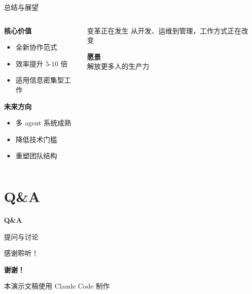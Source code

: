 \documentclass[aspectratio=169,xcolor=dvipsnames]{beamer}
\begin{document}
\begin{frame}{总结与展望}
  \begin{columns}
    \begin{column}{0.48\textwidth}
      \textbf{核心价值}
      \begin{itemize}
        \item 全新协作范式
        \item 效率提升 5-10 倍
        \item 适用信息密集型工作
      \end{itemize}

      \vspace{0.5cm}

      \textbf{未来方向}
      \begin{itemize}
        \item 多 agent 系统成熟
        \item 降低技术门槛
        \item 重塑团队结构
      \end{itemize}
    \end{column}
    \begin{column}{0.48\textwidth}
      \begin{alertblock}{变革正在发生}
        从开发、运维到管理，工作方式正在改变
      \end{alertblock}

      \vspace{0.5cm}

      \begin{center}
        \large
        \textbf{愿景}\\
        \vspace{0.3cm}
        解放更多人的生产力
      \end{center}
    \end{column}
  \end{columns}
\end{frame}

\section{Q\&A}

\begin{frame}[plain]
  \centering
  \Huge \textbf{Q\&A}

  \vspace{1cm}
  \Large
  提问与讨论

  \vspace{1cm}
  \normalsize
  感谢聆听！
\end{frame}

\begin{frame}[plain]
  \centering
  \Huge \textbf{谢谢！}

  \vspace{1cm}
  \normalsize

  \vspace{0.5cm}
  \small
  本演示文稿使用 Claude Code 制作
\end{frame}
\end{document}
